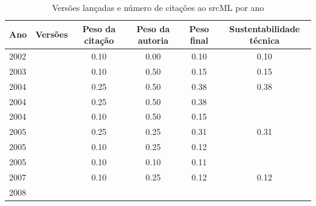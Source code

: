 \begin{table}[H]
\caption{Versões lançadas e número de citações ao srcML por ano}
\centering
\begin{tabular}{| l | c | c | c | c | c |}
  \hline
  Ano & Versões & Peso da citação & Peso da autoria & Peso final & Sustentabilidade técnica \\
  \hline
            2002
          &
          
          &
          0.10
          &
          0.00
          &
          0.10
          &
            {\color{red} 0.10}
          \\
\hline
            2003
          &
          
          &
          0.10
          &
          0.50
          &
          0.15
          &
            {\color{red} 0.15}
          \\
\hline
            2004
          &
          
          &
          0.25
          &
          0.50
          &
          0.38
          &
            {\color{red} 0.38}
          \\
            2004
          &
          
          &
          0.25
          &
          0.50
          &
          0.38
          &
          \\
            2004
          &
          
          &
          0.10
          &
          0.50
          &
          0.15
          &
          \\
\hline
            2005
          &
          
          &
          0.25
          &
          0.25
          &
          0.31
          &
            {\color{red} 0.31}
          \\
            2005
          &
          
          &
          0.10
          &
          0.25
          &
          0.12
          &
          \\
            2005
          &
          
          &
          0.10
          &
          0.10
          &
          0.11
          &
          \\
\hline
            2007
          &
          
          &
          0.10
          &
          0.25
          &
          0.12
          &
            {\color{red} 0.12}
          \\
\hline
            2008
          &
          

\end{tabular}
\end{table}
